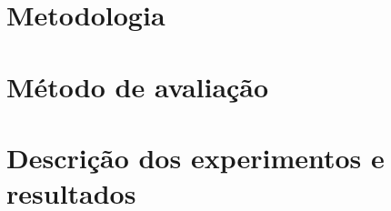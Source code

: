 \section{Metodologia}
\label{cha:metodologia}
	

\section{Método de avaliação}
\label{cha:avaliacao_parceval}
	

\section{Descrição dos experimentos e resultados}
\label{cha:experimentos}
	

%	

